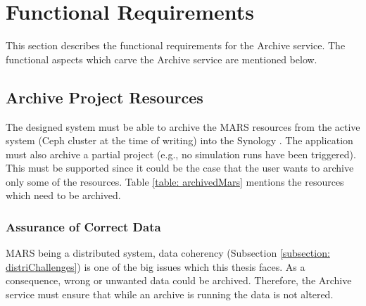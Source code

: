 
\section{Functional Requirements}
    \label{section:functionalReq}
    This section describes the functional requirements for the Archive service.
    The functional aspects which carve the Archive service are mentioned below.

    \subsection{Archive Project Resources}
        The designed system must be able to archive the MARS resources from the active system (Ceph cluster at the time of writing) 
        into the Synology \cite{Synology}. The application must also
        archive a partial project (e.g., no simulation runs have been triggered).
        This must be supported since it could be the case that the user wants to archive only some of the resources. Table \ref{table: archivedMars} mentions
        the resources which need to be archived.

        \subsubsection{Assurance of Correct Data}
            MARS being a distributed system, data coherency (Subsection \ref{subsection: distriChallenges}) 
            is one of the big issues which this thesis faces. As a consequence,
            wrong or unwanted data could be archived. Therefore, the Archive service must ensure that while an archive is running the data is not
            altered.
        
